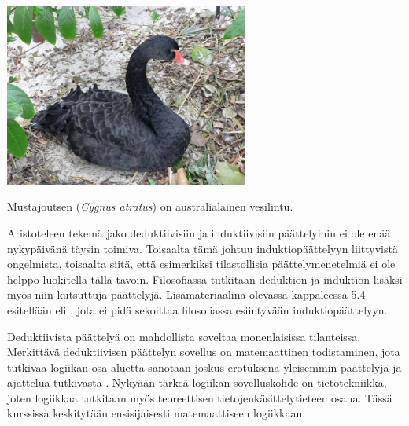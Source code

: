 \bigskip

\begin{center}
\includegraphics[width=8cm]{pictures/kuvitus/Cygnus_atratus1}

Mustajoutsen ({\it Cygnus atratus}) on australialainen vesilintu.
\end{center}

\bigskip

Aristoteleen tekemä jako deduktiivisiin ja induktiivisiin päättelyihin ei ole enää nykypäivänä täysin toimiva. Toisaalta tämä johtuu induktiopäättelyyn liittyvistä ongelmista, toisaalta siitä, että esimerkiksi tilastollisia päättelymenetelmiä ei ole helppo luokitella tällä tavoin. Filosofiassa tutkitaan deduktion ja induktion lisäksi myös niin kutsuttuja  päättelyjä. Lisämateriaalina olevassa kappaleessa 5.4 esitellään  eli , jota ei pidä sekoittaa filosofiassa esiintyvään induktiopäättelyyn.

Deduktiivista päättelyä on mahdollista soveltaa monenlaisissa tilanteissa. Merkittävä deduktiivisen päättelyn sovellus on matemaattinen todistaminen, jota tutkivaa logiikan osa-aluetta sanotaan joskus  erotuksena yleisemmin päättelyjä ja ajattelua tutkivasta . Nykyään tärkeä logiikan sovelluskohde on tietotekniikka, joten logiikkaa tutkitaan myös teoreettisen tietojen\-käsittely\-tieteen osana. Tässä kurssissa keskitytään ensisijaisesti matemaattiseen logiikkaan.


